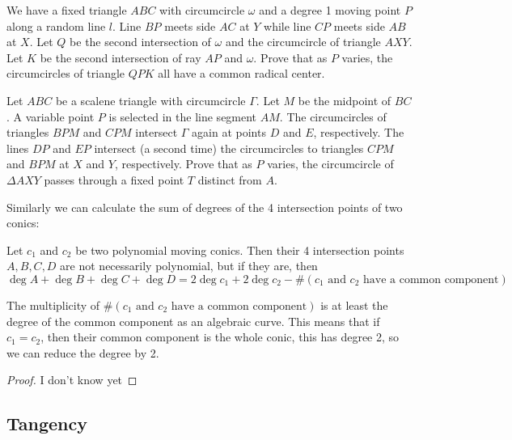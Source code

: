\documentclass[a4paper]{article}
\begin{document}
\begin{exercise}
    We have a fixed triangle $ABC$ with circumcircle $\omega$ and a degree 1 moving point $P$ along a random line $l$. Line $BP$ meets side $AC$ at $Y$ while line $CP$ meets side $AB$ at $X$. Let $Q$ be the second intersection of $\omega$ and the circumcircle of triangle $AXY$. Let $K$ be the second intersection of ray $AP$ and $\omega$. Prove that as $P$ varies, the circumcircles of triangle $QPK$ all have a common radical center.
\end{exercise}
\begin{exercise}
    Let $ABC$ be a scalene triangle with circumcircle $\Gamma$. Let $M$ be the midpoint of $BC$. A variable point $P$ is selected in the line segment $AM$. The circumcircles of triangles $BPM$ and $CPM$ intersect $\Gamma$ again at points $D$ and $E$, respectively. The lines $DP$ and $EP$ intersect (a second time) the circumcircles to triangles $CPM$ and $BPM$ at $X$ and $Y$, respectively. Prove that as $P$ varies, the circumcircle of $\Delta AXY$ passes through a fixed point $T$ distinct from $A$.
\end{exercise}

Similarly we can calculate the sum of degrees of the 4 intersection points of two conics:

\begin{theorem}
    Let $c_1$ and $c_2$ be two polynomial moving conics. Then their 4 intersection points $A,B,C,D$ are not necessarily polynomial, but if they are, then
    $$\deg A+\deg B+\deg C+\deg D =2\deg c_1 + 2\deg c_2-\#(\text{$c_1$ and $c_2$ have a common component})$$
\end{theorem}
\begin{remark}
    The multiplicity of $\#(\text{$c_1$ and $c_2$ have a common component})$ is at least the degree of the common component as an algebraic curve. This means that if $c_1=c_2$, then their common component is the whole conic, this has degree 2, so we can reduce the degree by 2.
\end{remark}
\begin{proof}
    I don't know yet
\end{proof}
\begin{example}
    
\end{example}

\subsection{Tangency}
\end{document}
